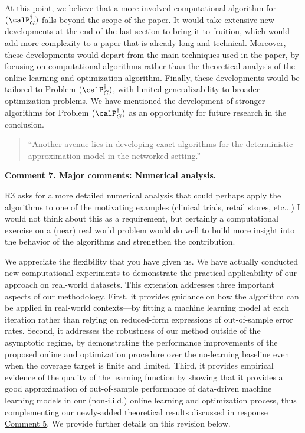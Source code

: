 \documentclass[11pt]{article}
\begin{document}
At this point, we believe that a more involved computational algorithm for $(\calP^\dagger_G)$ falls beyond the scope of the paper. It would take extensive new developments at the end of the last section to bring it to fruition, which would add more complexity to a paper that is already long and technical. Moreover, these developments would depart from the main techniques used in the paper, by focusing on computational algorithms rather than the theoretical analysis of the online learning and optimization algorithm. Finally, these developments would be tailored to Problem $(\calP^\dagger_G)$, with limited generalizability to broader optimization problems. We have mentioned the development of stronger algorithms for Problem $(\calP^\dagger_G)$ as an opportunity for future research in the conclusion.
\begin{quote}
    ``Another avenue lies in developing exact algorithms for the deterministic approximation model in the networked setting.''
\end{quote}

\begin{commentBox}
\textbf{Comment 7. Major comments: Numerical analysis.}\label{AE:7}

R3 asks for a more detailed numerical analysis that could perhaps apply the algorithms to one of the motivating examples (clinical trials, retail stores, etc...) I would not think about this as a requirement, but certainly a computational exercise on a (near) real world problem would do well to build more insight into the behavior of the algorithms and strengthen the contribution.
\end{commentBox}

We appreciate the flexibility that you have given us. We have actually conducted new computational experiments to demonstrate the practical applicability of our approach on real-world datasets. This extension addresses three important aspects of our methodology. First, it provides guidance on how the algorithm can be applied in real-world contexts---by fitting a machine learning model at each iteration rather than relying on reduced-form expressions of out-of-sample error rates. Second, it addresses the robustness of our method outside of the asymptotic regime, by demonstrating the performance improvements of the proposed online and optimization procedure over the no-learning baseline even when the coverage target is finite and limited. Third, it provides empirical evidence of the quality of the learning function by showing that it provides a good approximation of out-of-sample performance of data-driven machine learning models in our (non-i.i.d.) online learning and optimization process, thus complementing our newly-added theoretical results discussed in response \hyperref[AE:5]{\color{blue}Comment 5}. We provide further details on this revision below.
\end{document}
